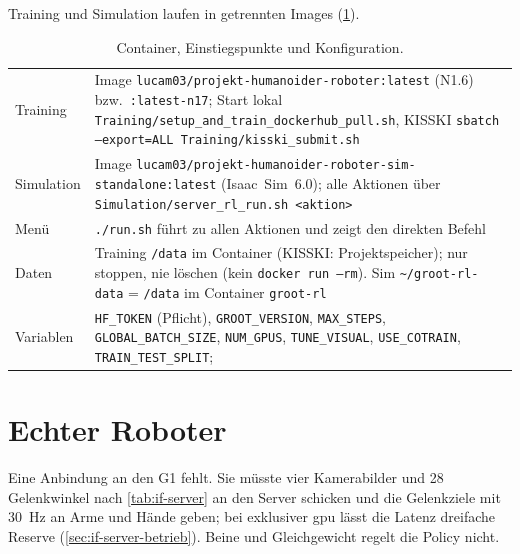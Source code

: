 Training und Simulation laufen in getrennten Images (\cref{tab:if-container}).

\begin{table}[htb]
  \centering
  \begin{tabularx}{\linewidth}{lX}
    \toprule
    Training & Image \texttt{lucam03/projekt-humanoider-roboter:latest} (N1.6) bzw.\
      \texttt{:latest-n17}; Start lokal \texttt{Training/setup\_and\_train\_dockerhub\_pull.sh},
      KISSKI \texttt{sbatch --export=ALL Training/kisski\_submit.sh} \\
    Simulation & Image \texttt{lucam03/projekt-humanoider-roboter-sim-standalone:latest}
      (Isaac~Sim~6.0); alle Aktionen über \texttt{Simulation/server\_rl\_run.sh <aktion>} \\
    Menü & \texttt{./run.sh} führt zu allen Aktionen und zeigt den direkten Befehl \\
    Daten & Training \texttt{/data} im Container (KISSKI: Projektspeicher); nur stoppen,
      nie löschen (kein \texttt{docker run --rm}). Sim
      \texttt{\textasciitilde/groot-rl-data} = \texttt{/data} im Container \texttt{groot-rl} \\
    Variablen & \texttt{HF\_TOKEN} (Pflicht), \texttt{GROOT\_VERSION}, \texttt{MAX\_STEPS},
      \texttt{GLOBAL\_BATCH\_SIZE}, \texttt{NUM\_GPUS}, \texttt{TUNE\_VISUAL},
      \texttt{USE\_COTRAIN}, \texttt{TRAIN\_TEST\_SPLIT};
      \doc{docs/training/env-vars.md} \\
    \bottomrule
  \end{tabularx}
  \caption{Container, Einstiegspunkte und Konfiguration.}
  \label{tab:if-container}
\end{table}

\section{Echter Roboter}
\label{sec:if-roboter}

Eine Anbindung an den G1 fehlt. Sie müsste vier Kamerabilder und 28 Gelenkwinkel nach
\cref{tab:if-server} an den Server schicken und die Gelenkziele mit 30~Hz an
Arme und Hände geben; bei exklusiver \acs{gpu} lässt die Latenz dreifache Reserve
(\cref{sec:if-server-betrieb}). Beine und Gleichgewicht regelt die
Policy nicht.
